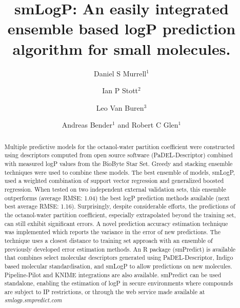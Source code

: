 \documentclass[10pt]{bmc_article}
\newenvironment{bmcformat}{\begin{raggedright}\baselineskip20pt\sloppy\setboolean{publ}{false}}{\end{raggedright}\baselineskip20pt\sloppy}
\begin{document}
\begin{bmcformat}

\title{smLogP: An easily integrated ensemble based logP prediction algorithm for small molecules.}

\author{Daniel S Murrell$^1$%
        \and
        Ian P Stott$^2$%
       \and
        Leo Van Buren$^3$%
      	\and
         Andreas Bender$^1$%
       and
         Robert C Glen\correspondingauthor$^1$%
      }
      
\address{
    \iid(1)Unilever Centre for Molecular Science Informatics,
    Department of Chemistry, University of Cambridge, Lensfield Road,
    Cambridge CB2 1EW, UK\\
    \iid(2)Unilever Research, Bebington, UK\\
    \iid(3)Unilever R\&D Vlaardingen, Olivier van Noortlaan 120, PO Box 114, 3130 AC Vlaardingen, The Netherlands
}

\maketitle

\begin{abstract}
Multiple predictive models for the octanol-water partition coefficient were constructed using descriptors computed from open source software (PaDEL-Descriptor) combined with measured logP values from the BioByte Star Set. Greedy and stacking ensemble techniques were used to combine these models. The best ensemble of models, smLogP, used a weighted combination of support vector regression and generalized boosted regression. When tested on two independent external validation sets, this ensemble outperforms (average RMSE: 1.04) the best logP prediction methods available (next best average RMSE: 1.16). Surprisingly, despite considerable efforts, the predictions of the octanol-water partition coefficient, especially extrapolated beyond the training set, can still exhibit significant errors. A novel prediction accuracy estimation technique was implemented which reports the variance in the error of new predictions. The technique uses a closest distance to training set approach with an ensemble of previously developed error estimation methods. An R package (smPredict) is available that combines select molecular descriptors generated using PaDEL-Descriptor, Indigo based molecular standardisation, and smLogP to allow predictions on new molecules. Pipeline-Pilot and KNIME integrations are also available. smPredict can be used standalone, enabling the estimation of logP in secure environments where compounds are subject to IP restrictions, or through the web service made available at \textit{smlogp.smpredict.com}
\end{abstract} 


\end{bmcformat}
\end{document}
